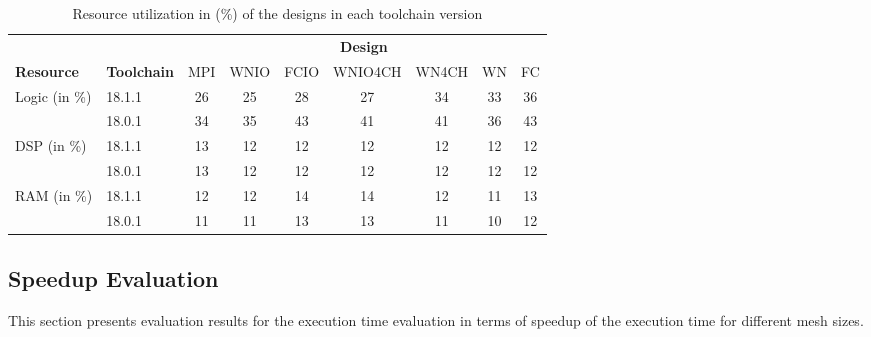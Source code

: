 \begin{table}[ht]
    \centering
    \caption{Resource utilization in (\%) of the designs in each toolchain version}
    \label{tab:sys_resource}
    \begin{tabular}{llccccccc}
     &  & \multicolumn{7}{c}{\textbf{Design}} \\
     \cline{3-9}
     \textbf{Resource} & \textbf{Toolchain} & MPI & WNIO & FCIO & WNIO4CH & WN4CH & WN & FC \\
    \hline
    \multirow{2}{*}{Logic (in \%)} & 18.1.1 & 26 & 25 & 28 & 27 & 34 & 33 & 36 \\
    \cline{2-9}
     & 18.0.1 & 34 & 35 & 43 & 41 & 41 & 36 & 43 \\
     \cline{1-9}
    \multirow{2}{*}{DSP (in \%)} & 18.1.1 & 13 & 12 & 12 & 12 & 12 & 12 & 12 \\
    \cline{2-9}
     & 18.0.1 & 13 & 12 & 12 & 12 & 12 & 12 & 12 \\
     \cline{1-9}
    \multirow{2}{*}{RAM (in \%)} & 18.1.1 & 12 & 12 & 14 & 14 & 12 & 11 & 13 \\
    \cline{2-9}
     & 18.0.1 & 11 & 11 & 13 & 13 & 11 & 10 & 12 \\
     \hline
    \end{tabular}
\end{table}


\subsection{Speedup Evaluation}

This section presents evaluation results for the execution time evaluation
in terms of speedup of the execution time for different mesh sizes.

